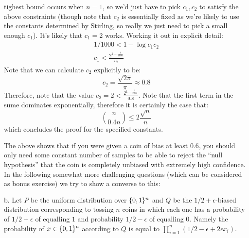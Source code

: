 \documentclass{article}
\begin{document}
\begin{enumerate}[,start=3]
\begin{enumerate}[,label=\Roman*)]
\begin{enumerate}[noitemsep,topsep=\mdcompacttopsep,label=\alph*.]
tighest bound occurs when $n = 1$, so we'd just have to pick $c_1,c_2$ to satisfy the above constraints (though
note that $c_2$ is essentially fixed as we're likely to use the constants determined by Stirling, so really we just need to pick
a small enough $c_1$). It's likely that $c_1 = 2$ works. Working it out in explicit detail:
\noindent\noindent\[%
\begin{aligned}
1/1000 < 1 - \log c_1 c_2 \\
c_1 < \frac{2^{1 - \frac{1}{1000}}}{c_2}
\end{aligned}
\]%
Note that we can calculate $c_2$ explicitly to be:
\noindent\noindent\[%
c_2 = \frac{\sqrt{2\pi}}{\pi} \approx 0.8
\]%
Therefore, note that the value $c_2 = 2 < \frac{2^{1 - \frac{1}{1000}}}{0.8}$. Note that the first term in the
sume dominates exponentially, therefore it is certainly the case that:
\noindent\noindent\[%
{n \choose 0.4n } \leq 2 \frac{\sqrt{n}}{n}
\]%
which concludes the proof for the specified constants. 
\mdfloatright{\ensuremath{\Box}}%
\end{enumerate}%

The above shows that if you were given a coin of bias at least $0.6$, you should only need some constant number of samples to be  able to reject the \textquotedblleft{}null hypothesis\textquotedblright{} that
the coin is completely unbiased with extremely high confidence. In the following somewhat more challenging questions (which can be considered as bonus exercise) we try to show a converse to this:%

b. Let $P$ be the uniform distribution over $\{0,1\}^n$ and $Q$ be the $1/2+\epsilon$-biased distribution corresponding to tossing $n$ coins in which each one
has a probability of $1/2+\epsilon$ of equalling $1$ and probability $1/2-\epsilon$ of equalling $0$. Namely the probability of $x\in\{0,1\}^n$ according to $Q$ is equal to
$\prod_{i=1}^n (1/2 - \epsilon + 2\epsilon x_i)$.%


\end{enumerate}
\end{enumerate}
\end{document}
